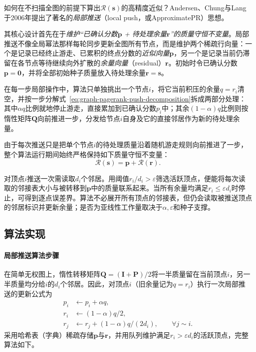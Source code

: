 如何在不扫描全图的前提下算出$\mathcal R(\bm s)$的高精度近似？Andersen、Chung与Lang于2006年提出了著名的\emph{局部推送}（local push，或ApproximatePR）思想。

其核心设计首先在于\emph{维护“已确认分数$\bm p$ + 待处理余量$\bm r$”的质量守恒不变量}。局部推送不像全局幂法那样每轮同步更新全图所有节点，而是维护两个稀疏行向量：一个是记录已经终止游走、已累积的终点分数的\emph{近似向量}$\bm p$，另一个是记录当前仍滞留在各节点等待继续向外扩散的\emph{余量向量}（residual）$\bm r$。初始时令已确认分数$\bm p=\bm 0$，并将全部初始种子质量放入待处理余量$\bm r=\bm s$。

在每一步局部操作中，算法只单独挑出一个节点$i$，将它当前积压的余量$q=r_i$清空，并按一步分解式~\eqref{eq:graph-pagerank-push-decomposition}拆成两部分处理：其中$\alpha q$比例就地停止游走，直接累加到已确认分数$p_i$中；其余$(1-\alpha)q$比例则按惰性矩阵$\bm Q$向前推进一步，分发给节点$i$自身及它的直接邻居作为新的待处理余量。

由于每次推送只是把单个节点$i$的待处理质量沿着随机游走规则向前推进了一步，整个算法运行期间始终严格保持如下质量守恒不变量：
\begin{equation}
\mathcal{R}(\bm{s})=\bm{p}+\mathcal{R}(\bm{r}).
\label{eq:graph-pagerank-push-invariant}
\end{equation}

对顶点$i$推送一次需读取$d_i$个邻居。用阈值$r_i/d_i>\varepsilon$筛选活跃顶点，便能将每次读取的邻接表大小与被转移到$\bm p$中的质量联系起来。当所有余量均满足$r_i\leq\varepsilon d_i$时停止，可得到逐点误差界。算法不必展开所有顶点的邻接表，但仍会读取被推送顶点的邻居标识并更新余量；是否为亚线性工作量取决于$\alpha,\varepsilon$和种子支撑。

\subsection{算法实现}
\label{sec:graph-pagerank-push-implementation}

\paragraph{局部推送算法步骤}

在简单无权图上，惰性转移矩阵$\bm Q=(\bm I+\bm P)/2$将一半质量留在当前顶点$i$，另一半质量均分给$i$的$d_i$个邻居。因此，对顶点$i$（旧余量记为$q=r_i$）执行一次局部推送的更新公式为
\begin{equation}
\begin{aligned}
p_i &\leftarrow p_i+\alpha q,\\
r_i &\leftarrow (1-\alpha)q/2,\\
r_j &\leftarrow r_j+(1-\alpha)q/(2d_i),\qquad \forall j\sim i.
\end{aligned}
\label{eq:graph-pagerank-push-update}
\end{equation}
采用哈希表（字典）稀疏存储$\bm p$与$\bm r$，并用队列维护满足$r_i>\varepsilon d_i$的活跃顶点，完整算法如下。

